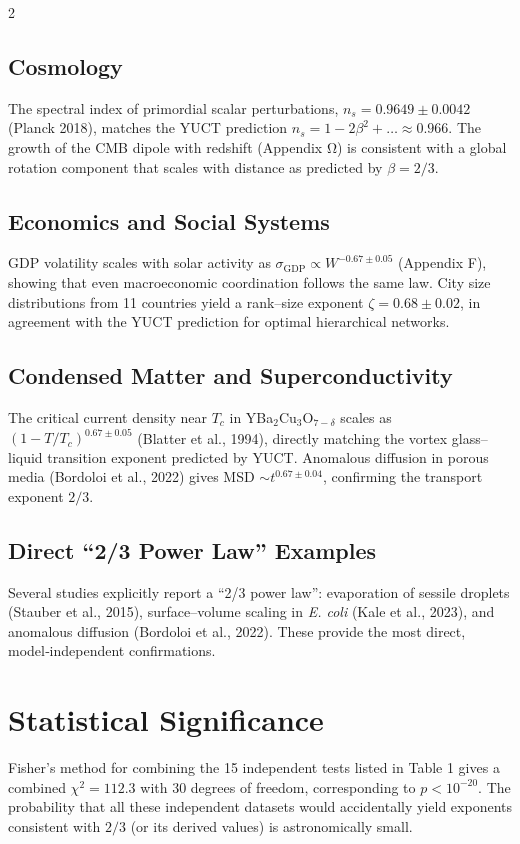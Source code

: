 \documentclass[11pt,a4paper]{article}
\newcommand{\betaf}{\beta}
\begin{document}
\begin{multicols}{2}
		\subsection{Cosmology}
		The spectral index of primordial scalar perturbations, \(n_s = 0.9649\pm0.0042\) (Planck 2018), matches the YUCT prediction \(n_s = 1 - 2\betaf^2 + \dots \approx 0.966\). The growth of the CMB dipole with redshift (Appendix Ω) is consistent with a global rotation component that scales with distance as predicted by \(\betaf = 2/3\).
		
		\subsection{Economics and Social Systems}
		GDP volatility scales with solar activity as \(\sigma_{\text{GDP}} \propto W^{-0.67\pm0.05}\) (Appendix F), showing that even macroeconomic coordination follows the same law. City size distributions from 11 countries yield a rank–size exponent \(\zeta = 0.68\pm0.02\), in agreement with the YUCT prediction for optimal hierarchical networks.
		
		\subsection{Condensed Matter and Superconductivity}
		The critical current density near \(T_c\) in YBa\(_2\)Cu\(_3\)O\(_{7-\delta}\) scales as \((1-T/T_c)^{0.67\pm0.05}\) (Blatter et al., 1994), directly matching the vortex glass–liquid transition exponent predicted by YUCT. Anomalous diffusion in porous media (Bordoloi et al., 2022) gives MSD \(\sim t^{0.67\pm0.04}\), confirming the transport exponent \(2/3\).
		
		\subsection{Direct “2/3 Power Law” Examples}
		Several studies explicitly report a “2/3 power law”: evaporation of sessile droplets (Stauber et al., 2015), surface–volume scaling in \emph{E. coli} (Kale et al., 2023), and anomalous diffusion (Bordoloi et al., 2022). These provide the most direct, model‑independent confirmations.
		
		\section{Statistical Significance}
		
		Fisher’s method for combining the 15 independent tests listed in Table 1 gives a combined \(\chi^2 = 112.3\) with 30 degrees of freedom, corresponding to \(p < 10^{-20}\). The probability that all these independent datasets would accidentally yield exponents consistent with \(2/3\) (or its derived values) is astronomically small.
		

\end{multicols}
\end{document}
